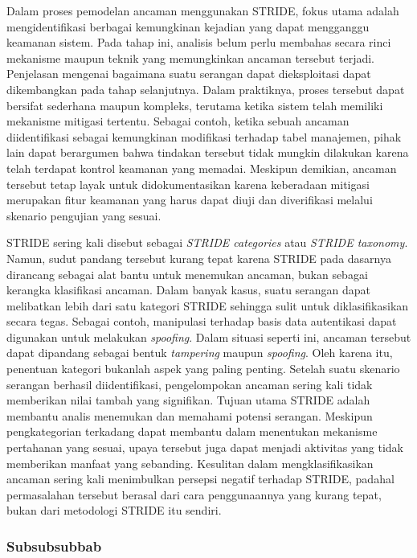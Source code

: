 Dalam proses pemodelan ancaman menggunakan STRIDE, fokus utama adalah mengidentifikasi berbagai kemungkinan kejadian yang dapat mengganggu keamanan sistem. Pada tahap ini, analisis belum perlu membahas secara rinci mekanisme maupun teknik yang memungkinkan ancaman tersebut terjadi. Penjelasan mengenai bagaimana suatu serangan dapat dieksploitasi dapat dikembangkan pada tahap selanjutnya. Dalam praktiknya, proses tersebut dapat bersifat sederhana maupun kompleks, terutama ketika sistem telah memiliki mekanisme mitigasi tertentu. Sebagai contoh, ketika sebuah ancaman diidentifikasi sebagai kemungkinan modifikasi terhadap tabel manajemen, pihak lain dapat berargumen bahwa tindakan tersebut tidak mungkin dilakukan karena telah terdapat kontrol keamanan yang memadai. Meskipun demikian, ancaman tersebut tetap layak untuk didokumentasikan karena keberadaan mitigasi merupakan fitur keamanan yang harus dapat diuji dan diverifikasi melalui skenario pengujian yang sesuai.

STRIDE sering kali disebut sebagai \textit{STRIDE categories} atau \textit{STRIDE taxonomy}. Namun, sudut pandang tersebut kurang tepat karena STRIDE pada dasarnya dirancang sebagai alat bantu untuk menemukan ancaman, bukan sebagai kerangka klasifikasi ancaman. Dalam banyak kasus, suatu serangan dapat melibatkan lebih dari satu kategori STRIDE sehingga sulit untuk diklasifikasikan secara tegas. Sebagai contoh, manipulasi terhadap basis data autentikasi dapat digunakan untuk melakukan \textit{spoofing}. Dalam situasi seperti ini, ancaman tersebut dapat dipandang sebagai bentuk \textit{tampering} maupun \textit{spoofing}. Oleh karena itu, penentuan kategori bukanlah aspek yang paling penting. Setelah suatu skenario serangan berhasil diidentifikasi, pengelompokan ancaman sering kali tidak memberikan nilai tambah yang signifikan. Tujuan utama STRIDE adalah membantu analis menemukan dan memahami potensi serangan. Meskipun pengkategorian terkadang dapat membantu dalam menentukan mekanisme pertahanan yang sesuai, upaya tersebut juga dapat menjadi aktivitas yang tidak memberikan manfaat yang sebanding. Kesulitan dalam mengklasifikasikan ancaman sering kali menimbulkan persepsi negatif terhadap STRIDE, padahal permasalahan tersebut berasal dari cara penggunaannya yang kurang tepat, bukan dari metodologi STRIDE itu sendiri.

\subsubsection{Subsubsubbab}
\blindtext

\blindtext
